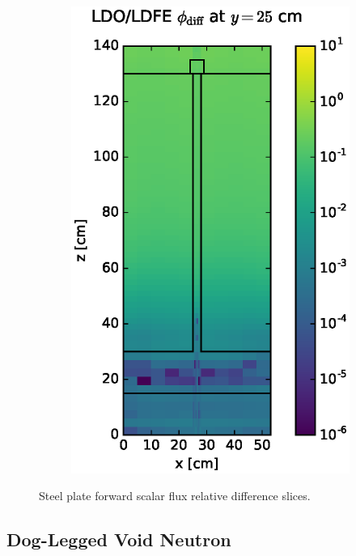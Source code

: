 \documentclass{article} %
\begin{document}
\begin{figure}[!htb]
\begin{subfigure}{0.4\textwidth}
\includegraphics[max height=0.445\textheight]
{img/steel-flux-diff-ldfe.eps}
\end{subfigure}
\caption{Steel plate forward scalar flux relative difference slices.}
\label{steel-fwd-diff-rel}
\end{figure}

\subsection{Dog-Legged Void Neutron}
\end{document}
